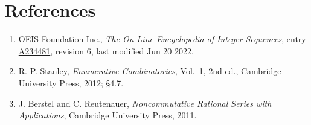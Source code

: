 \documentclass[11pt]{article}
\theoremstyle{definition}
\begin{document}
\section{References}

\begin{enumerate}

\item OEIS Foundation Inc., \emph{The On-Line Encyclopedia of Integer Sequences}, entry \href{https://oeis.org/A234481}{A234481}, revision 6, last modified Jun 20 2022.

\item R. P. Stanley, \emph{Enumerative Combinatorics}, Vol.~1, 2nd ed., Cambridge University Press, 2012; \S4.7.

\item J. Berstel and C. Reutenauer, \emph{Noncommutative Rational Series with Applications}, Cambridge University Press, 2011.

\end{enumerate}
\end{document}
